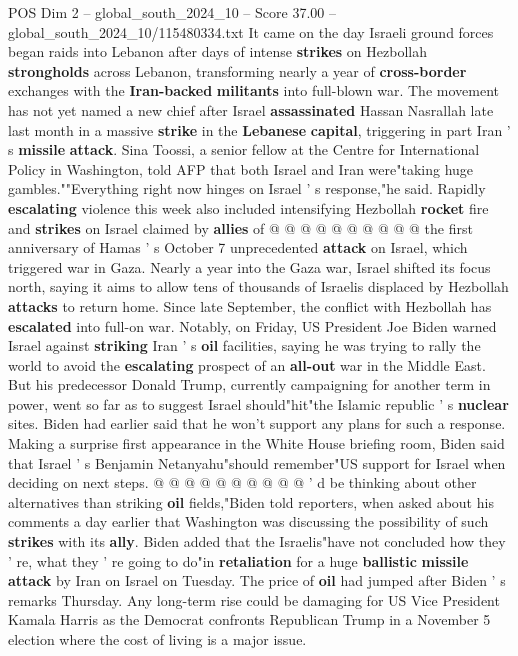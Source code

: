 \begin{textsample}{POS Dim 2 – global\_south\_2024\_10 – Score 37.00 – global\_south\_2024\_10/115480334.txt}
It came on the day Israeli ground forces began raids into Lebanon after days of intense \textbf{strikes} on Hezbollah \textbf{strongholds} across Lebanon, transforming nearly a year of \textbf{cross-border} exchanges with the \textbf{Iran-backed} \textbf{militants} into full-blown war.
The movement has not yet named a new chief after Israel \textbf{assassinated} Hassan Nasrallah late last month in a massive \textbf{strike} in the \textbf{Lebanese} \textbf{capital}, triggering in part Iran ' s \textbf{missile} \textbf{attack}.
Sina Toossi, a senior fellow at the Centre for International Policy in Washington, told AFP that both Israel and Iran were"taking huge gambles.""Everything right now hinges on Israel ' s response,"he said.
Rapidly \textbf{escalating} violence this week also included intensifying Hezbollah \textbf{rocket} fire and \textbf{strikes} on Israel claimed by \textbf{allies} of @ @ @ @ @ @ @ @ @ @ the first anniversary of Hamas ' s October 7 unprecedented \textbf{attack} on Israel, which triggered war in Gaza.
Nearly a year into the Gaza war, Israel shifted its focus north, saying it aims to allow tens of thousands of Israelis displaced by Hezbollah \textbf{attacks} to return home.
Since late September, the conflict with Hezbollah has \textbf{escalated} into full-on war.
Notably, on Friday, US President Joe Biden warned Israel against \textbf{striking} Iran ' s \textbf{oil} facilities, saying he was trying to rally the world to avoid the \textbf{escalating} prospect of an \textbf{all-out} war in the Middle East.
But his predecessor Donald Trump, currently campaigning for another term in power, went so far as to suggest Israel should"hit"the Islamic republic ' s \textbf{nuclear} sites.
Biden had earlier said that he won't support any plans for such a response.
Making a surprise first appearance in the White House briefing room, Biden said that Israel ' s Benjamin Netanyahu"should remember"US support for Israel when deciding on next steps. @ @ @ @ @ @ @ @ @ @ ' d be thinking about other alternatives than striking \textbf{oil} fields,"Biden told reporters, when asked about his comments a day earlier that Washington was discussing the possibility of such \textbf{strikes} with its \textbf{ally}.
Biden added that the Israelis"have not concluded how they ' re, what they ' re going to do"in \textbf{retaliation} for a huge \textbf{ballistic} \textbf{missile} \textbf{attack} by Iran on Israel on Tuesday.
The price of \textbf{oil} had jumped after Biden ' s remarks Thursday.
Any long-term rise could be damaging for US Vice President Kamala Harris as the Democrat confronts Republican Trump in a November 5 election where the cost of living is a major issue.

\end{textsample}
